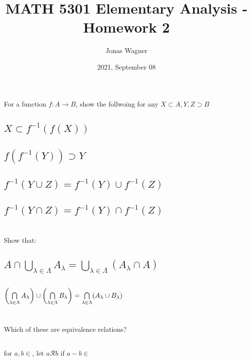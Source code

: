 \documentclass[]{article}
\title{MATH 5301 Elementary Analysis - Homework 2}
\author{Jonas Wagner}
\date{2021, September 08}
\begin{document}
\maketitle

\section{}
For a function $f : A \rightarrow B$, show the follwoing for any $X \subset A, Y, Z \supset B$

\subsection{$X \subset f^{-1}(f(X))$}




\subsection{$f(f^{-1}(Y)) \supset Y$}


\subsection{$f^{-1}(Y \cup Z) = f^{-1}(Y) \cup f^{-1}(Z)$}




\subsection{$f^{-1}(Y \cap Z) = f^{-1}(Y) \cap f^{-1}(Z)$}





\newpage
\section{}
Show that:

\subsection{
	$A \cap \bigcup\limits_{\lambda \in \Lambda}  A_\lambda 
	= \bigcup\limits_{\lambda \in \Lambda} (A_\lambda \cap A)$
}



\subsection{
	$\qty(\bigcap\limits_{\lambda\in\Lambda} A_{\lambda}) \cup
	 \qty(\bigcap\limits_{\lambda\in\Lambda} B_{\lambda})
	 = \bigcap\limits_{\lambda\in\Lambda} (A_\lambda \cup B_\lambda)$
}











\newpage
\section{}
Which of these are equivalence relations?

\subsection{}
for $a, b \in$,
let $a \mathcal{R} b$
if $a - b \in $
\end{document}
